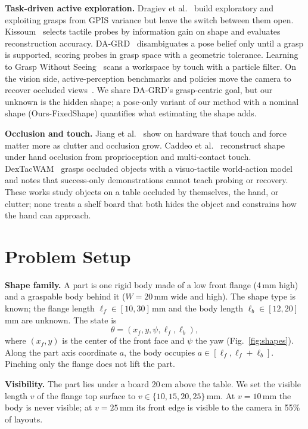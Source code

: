 \documentclass[conference]{IEEEtran}
\newcommand{\Fix}{Ours-FixedShape}
\begin{document}
\textbf{Task-driven active exploration.} Dragiev et al.~\cite{dragiev2013uncertainty} build exploratory and exploiting grasps from GPIS variance but leave the switch between them open. Kissoum~\cite{kissoum2023tactile} selects tactile probes by information gain on shape and evaluates reconstruction accuracy. DA-GRD~\cite{wang2026dagrd} disambiguates a pose belief only until a grasp is supported, scoring probes in grasp space with a geometric tolerance. Learning to Grasp Without Seeing~\cite{murali2018grasp} scans a workspace by touch with a particle filter. On the vision side, active-perception benchmarks and policies move the camera to recover occluded views~\cite{luo2026recovering,liu2026sapave}. We share DA-GRD's grasp-centric goal, but our unknown is the hidden shape; a pose-only variant of our method with a nominal shape (\Fix) quantifies what estimating the shape adds.

\textbf{Occlusion and touch.} Jiang et al.~\cite{jiang2026touchmatter} show on hardware that touch and force matter more as clutter and occlusion grow. Caddeo et al.~\cite{caddeo2026physgen} reconstruct shape under hand occlusion from proprioception and multi-contact touch. DexTacWAM~\cite{yuan2026dextacwam} grasps occluded objects with a visuo-tactile world-action model and notes that success-only demonstrations cannot teach probing or recovery. These works study objects on a table occluded by themselves, the hand, or clutter; none treats a shelf board that both hides the object and constrains how the hand can approach.

\section{Problem Setup}

\textbf{Shape family.} A part is one rigid body made of a low front flange (4\,mm high) and a graspable body behind it ($W=20$\,mm wide and high). The shape type is known; the flange length $\ell_f\in[10,30]$\,mm and the body length $\ell_b\in[12,20]$\,mm are unknown. The state is
\begin{equation}
\theta=(x_f, y, \psi, \ell_f, \ell_b),
\end{equation}
where $(x_f,y)$ is the center of the front face and $\psi$ the yaw (Fig.~\ref{fig:shapes}). Along the part axis coordinate $a$, the body occupies $a\in[\ell_f,\ell_f+\ell_b]$. Pinching only the flange does not lift the part.

\textbf{Visibility.} The part lies under a board 20\,cm above the table. We set the visible length $v$ of the flange top surface to $v\in\{10,15,20,25\}$\,mm. At $v=10$\,mm the body is never visible; at $v=25$\,mm its front edge is visible to the camera in 55\% of layouts.
\end{document}
